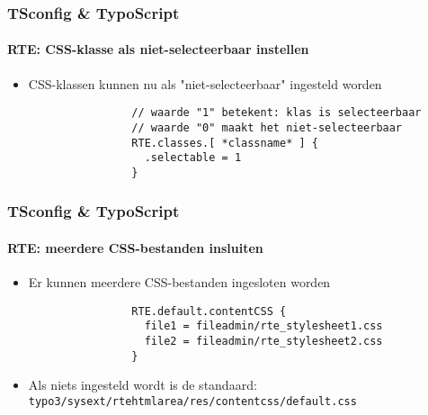 \begin{frame}[fragile]
	\frametitle{TSconfig \& TypoScript}
	\framesubtitle{RTE: CSS-klasse als niet-selecteerbaar instellen}

	\begin{itemize}
		\item CSS-klassen kunnen nu als "niet-selecteerbaar" ingesteld worden

			\begin{lstlisting}
				// waarde "1" betekent: klas is selecteerbaar
				// waarde "0" maakt het niet-selecteerbaar
				RTE.classes.[ *classname* ] {
				  .selectable = 1
				}
			\end{lstlisting}

	\end{itemize}

\end{frame}


\begin{frame}[fragile]
	\frametitle{TSconfig \& TypoScript}
	\framesubtitle{RTE: meerdere CSS-bestanden insluiten}

	\begin{itemize}
		\item Er kunnen meerdere CSS-bestanden ingesloten worden

			\begin{lstlisting}
				RTE.default.contentCSS {
				  file1 = fileadmin/rte_stylesheet1.css
				  file2 = fileadmin/rte_stylesheet2.css
				}
			\end{lstlisting}

		\item Als niets ingesteld wordt is de standaard:\newline
			\texttt{typo3/sysext/rtehtmlarea/res/contentcss/default.css}

	\end{itemize}

\end{frame}


